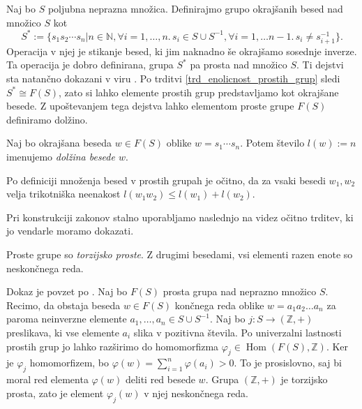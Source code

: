 Naj bo $S$ poljubna neprazna množica. Definirajmo grupo okrajšanih besed nad množico $S$ kot \begin{equation*}
    S^* := \{ s_1 s_2 \cdots s_n  \vert n \in \mathbb{N}, \forall i = 1, \ldots, n.\,  s_i \in S \cup S^{-1} , \forall i = 1 , \ldots n-1 .\, s_i \neq s_{i + 1}^{-1} \}.
\end{equation*}
Operacija v njej je stikanje besed, ki jim naknadno še okrajšamo sosednje inverze. Ta operacija je dobro definirana, grupa $S^*$ pa prosta nad množico $S$. 
Ti dejstvi sta natančno dokazani v viru \cite[str.~4, trditev 1.9]{Lyndon_Schupp_2015}. Po trditvi \ref{trd_enolicnost_prostih_grup} sledi $S^* \cong F(S)$,
zato si lahko elemente prostih grup predstavljamo kot okrajšane besede. Z upoštevanjem tega dejstva lahko elementom proste grupe $F(S)$ definiramo dolžino.

\begin{definicija}
\label{def_dolzina_besede}
Naj bo okrajšana beseda $w \in  F(S)$ oblike $w = s_1 \cdots s_n$. Potem število $l(w) := n$ imenujemo \emph{dolžina besede $w$}.
\end{definicija}
\begin{opomba}\label{opm_trikotniska_neenakost}
    Po definiciji množenja besed v prostih grupah je očitno, da za vsaki besedi $w_1 , w_2$ velja trikotniška neenakost $l(w_1 w_2) \le l(w_1) + l(w_2)$.
\end{opomba}

Pri konstrukciji zakonov stalno uporabljamo naslednjo na videz očitno trditev, ki jo vendarle moramo dokazati. 

\begin{trditev}\label{trd_prosta_grupa_je_torzijsko_prosta}
    Proste grupe so \emph{torzijsko proste}. Z drugimi besedami, vsi elementi razen enote so neskončnega reda. 
\end{trditev}
\begin{dokaz}
  Dokaz je povzet po \cite[str.~4--5]{Pogacnik_2024}. 
  Naj bo $F(S)$ prosta grupa nad neprazno množico $S$. Recimo, da obstaja beseda $w \in F(S)$ končnega reda oblike $w = a_1 a_2 \ldots a_n$ za paroma neinverzne elemente $a_1, \ldots , a_n \in S \cup S^{-1}$. Naj bo $j : S \to (\mathbb{Z}, +)$ preslikava, ki vse elemente $a_i$ slika v pozitivna števila. Po univerzalni lastnosti prostih grup jo lahko razširimo do homomorfizma $\varphi_j \in \operatorname{Hom}(F(S), \mathbb{Z})$. 
    Ker je $\varphi_j$ homomorfizem, bo $\varphi(w) = \sum_{i = 1}^{n} \varphi(a_i) > 0$. To je prosislovno, saj bi moral red elementa $\varphi(w)$ deliti red besede $w$.
    Grupa $(\mathbb{Z}, +)$ je torzijsko prosta, zato je element $\varphi_j(w)$ v njej neskončnega reda.
\end{dokaz}

